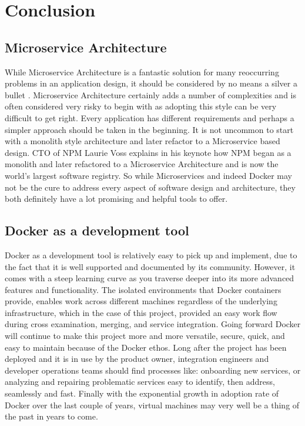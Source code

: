 \chapter{Conclusion}

\section{Microservice Architecture}
While Microservice Architecture is a fantastic solution for many reoccurring problems in an application design, it should be considered by no means a silver a bullet \cite{BuildingMicroServices}. Microservice Architecture certainly adds a number of complexities and is often considered very risky to begin with as adopting this style can be very difficult to get right. Every application has different requirements and perhaps a simpler approach should be taken in the beginning. It is not uncommon to start with a monolith style architecture and later refactor to a Microservice based design. CTO of NPM Laurie Voss explains in his keynote how NPM began as a monolith and later refactored to a Microservice Architecture and is now the world's largest software registry\cite{npm}. So while Microservices and indeed Docker may not be the cure to address every aspect of software design and architecture, they both definitely have a lot promising and helpful tools to offer.

\section{Docker as a development tool}
Docker as a development tool is relatively easy to pick up and implement, due to the fact that it is well supported and documented by its community. However, it comes with a steep learning curve as you traverse deeper into its more advanced features and functionality. The isolated environments that Docker containers provide, enables work across different machines regardless of the underlying infrastructure, which in the case of this project, provided an easy work flow during cross examination, merging, and service integration. Going forward Docker will continue to make this project more and more versatile, secure, quick, and easy to maintain because of the Docker ethos. Long after the project has been deployed and it is in use by the product owner, integration engineers and developer operations teams should find processes like: onboarding new services, or analyzing and repairing problematic services easy to identify, then address, seamlessly and fast. Finally with the exponential growth in adoption rate of Docker over the last couple of years, virtual machines may very well be a thing of the past in years to come.

